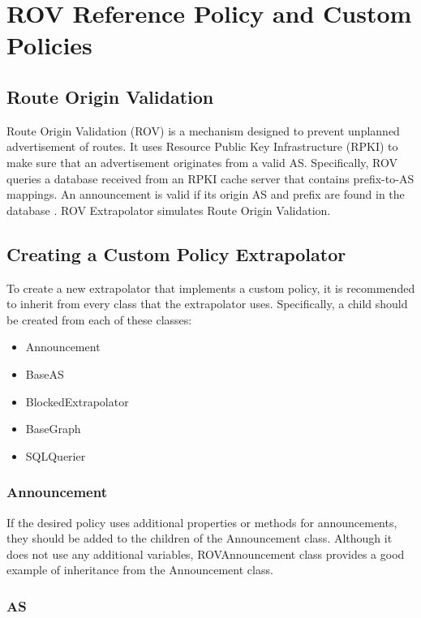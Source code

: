 \documentclass[letterpaper]{article}
\date{}
\begin{document}
\flushbottom
\thispagestyle{empty}

\section*{ROV Reference Policy and Custom Policies}

\subsection*{Route Origin Validation}

Route Origin Validation (ROV) is a mechanism designed to prevent unplanned
advertisement of routes. It uses Resource Public Key Infrastructure (RPKI) to
make sure that an advertisement originates from a valid AS. Specifically, ROV
queries a database received from an RPKI cache server that contains
prefix-to-AS mappings. An announcement is valid if its origin AS and prefix are
found in the database \cite{Juniper}. ROV Extrapolator simulates Route Origin
Validation.

\subsection*{Creating a Custom Policy Extrapolator}

To create a new extrapolator that implements a custom policy, it is recommended
to inherit from every class that the extrapolator uses. Specifically, a child
should be created from each of these classes: 

\begin{itemize}
\item Announcement
\item BaseAS
\item BlockedExtrapolator
\item BaseGraph
\item SQLQuerier
\end{itemize} 

\subsubsection*{Announcement}

If the desired policy uses additional properties or methods for announcements,
they should be added to the children of the Announcement class. Although it
does not use any additional variables, ROVAnnouncement class provides a good
example of inheritance from the Announcement class.

\subsubsection*{AS}
\end{document}
